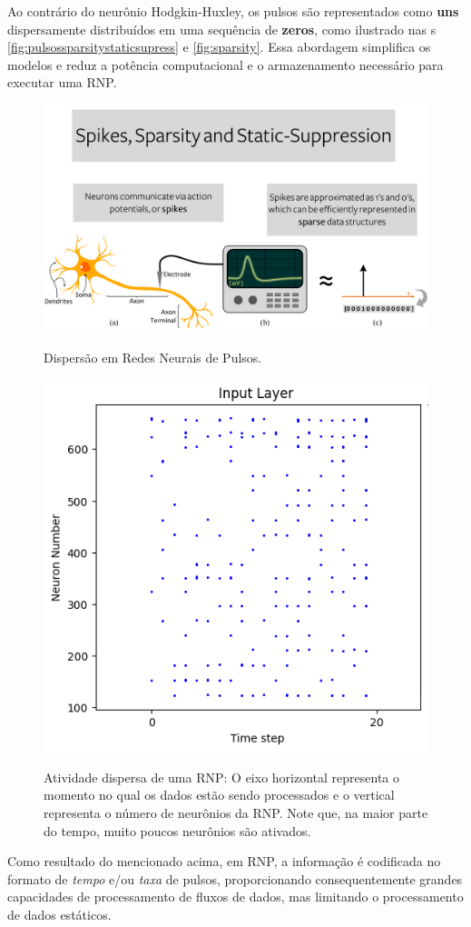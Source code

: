 			\par Ao contrário do neurônio Hodgkin-Huxley, os pulsos são representados como \textbf{uns} dispersamente distribuídos em uma sequência de \textbf{zeros}, como ilustrado nas s \autoref{fig:pulsossparsitystaticsupress} e \autoref{fig:sparsity}. Essa abordagem simplifica os modelos e reduz a potência computacional e o armazenamento necessário para executar uma RNP.
			
			\begin{figure}[H]
				\centering
				\caption{Dispersão em Redes Neurais de Pulsos.}
				\includegraphics[width=.8\linewidth]{images/spikesSparsityStaticSupress}
				\label{fig:pulsossparsitystaticsupress}
			\end{figure}
			
			\begin{figure}[H]
				\centering
				\caption[Atividade dispersa de uma RNP]{Atividade dispersa de uma RNP: O eixo horizontal representa o momento no qual os dados estão sendo processados e o vertical representa o número de neurônios da RNP. Note que, na maior parte do tempo, muito poucos neurônios são ativados.}
				\includegraphics[width=.4\linewidth]{images/sparsity}
				\label{fig:sparsity}
			\end{figure}
						
			\par Como resultado do mencionado acima, em RNP, a informação é codificada no formato de \textit{tempo} e/ou \textit{taxa} de pulsos, proporcionando consequentemente grandes capacidades de processamento de fluxos de dados, mas limitando o processamento de dados estáticos.
			
